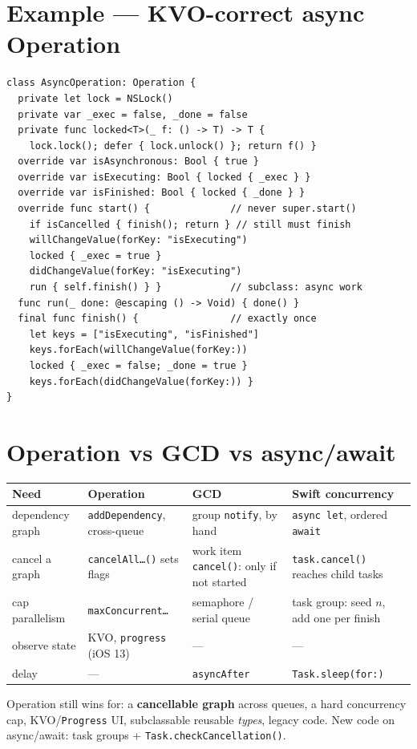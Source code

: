 \documentclass[8pt]{extarticle}
\begin{document}
\begin{multicols}{2}
\section{Example — KVO-correct async Operation}
\begin{lstlisting}[language=SwiftSheet]
class AsyncOperation: Operation {
  private let lock = NSLock()
  private var _exec = false, _done = false
  private func locked<T>(_ f: () -> T) -> T {
    lock.lock(); defer { lock.unlock() }; return f() }
  override var isAsynchronous: Bool { true }
  override var isExecuting: Bool { locked { _exec } }
  override var isFinished: Bool { locked { _done } }
  override func start() {              // never super.start()
    if isCancelled { finish(); return } // still must finish
    willChangeValue(forKey: "isExecuting")
    locked { _exec = true }
    didChangeValue(forKey: "isExecuting")
    run { self.finish() } }            // subclass: async work
  func run(_ done: @escaping () -> Void) { done() }
  final func finish() {                // exactly once
    let keys = ["isExecuting", "isFinished"]
    keys.forEach(willChangeValue(forKey:))
    locked { _exec = false; _done = true }
    keys.forEach(didChangeValue(forKey:)) }
}
\end{lstlisting}

\columnbreak

\section{Operation vs GCD vs async/await}
{\footnotesize\setlength{\tabcolsep}{2.5pt}
\begin{tabular}{@{}L{14mm}L{21mm}L{19mm}L{20mm}@{}}
\toprule
\textbf{Need} & \textbf{Operation} & \textbf{GCD} & \textbf{Swift concurrency} \\
\midrule
dependency graph & \texttt{addDependency}, cross-queue & group \texttt{notify}, by hand & \texttt{async let}, ordered \texttt{await} \\
cancel a graph & \texttt{cancelAll…()} sets flags & work item \texttt{cancel()}: only if not started & \texttt{task.cancel()} reaches child tasks \\
cap parallelism & \texttt{maxConcurrent…} & semaphore / serial queue & task group: seed $n$, add one per finish \\
observe state & KVO, \texttt{progress} (iOS 13) & — & — \\
delay & — & \texttt{asyncAfter} & \texttt{Task.sleep(for:)} \\
\bottomrule
\end{tabular}}
{\footnotesize Operation still wins for: a \textbf{cancellable graph} across queues, a hard
concurrency cap, KVO/\texttt{Progress} UI, subclassable reusable \emph{types}, legacy code.
New code on async/await: task groups + \texttt{Task.checkCancellation()}.}


\end{multicols}
\end{document}
